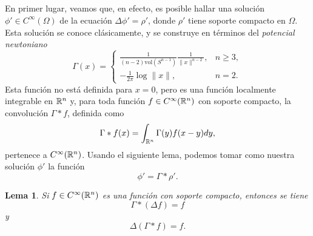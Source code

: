 \documentclass[11pt,a4paper]{amsbook}
\newtheorem{lemma}[subsection]{Lema}
\theoremstyle{remark} \newtheorem{rmk}[subsection]{Observación}
\theoremstyle{definition} \newtheorem{defn}[subsection]{Definición}
\theoremstyle{definition} \newtheorem{ex}[subsection]{Ejemplo}
\theoremstyle{definition} \newtheorem{ej}[subsection]{Ejercicio}
\begin{document}
\subsection{} En primer lugar, veamos que, en efecto, es posible hallar una solución $\phi'\in C^\infty(\Omega)$ de la ecuación $\Delta \phi' = \rho'$, donde $\rho'$ tiene soporte compacto en $\Omega$. Esta solución se conoce clásicamente, y se construye en términos del \emph{potencial newtoniano}
\begin{equation*}
  \Gamma(x) =
  \begin{cases}
\frac{1}{(n-2) \mathrm{vol}(S^{n-1})} \frac{1}{\lVert x \rVert^{n-2}},& n\geq 3, \\
- \frac{1}{2\pi} \log \lVert x \rVert,& n=2.
\end{cases}
\end{equation*}
Esta función no está definida para $x=0$, pero es una función localmente integrable en $\mathbb R^n$ y, para toda función $f\in C^\infty(\mathbb R^n)$ con soporte compacto, la convolución $\Gamma * f$, definida como
\begin{equation*}
\Gamma * f (x) = \int_{\mathbb R^n} \Gamma(y) f(x-y) dy,
\end{equation*}
pertenece a $C^\infty(\mathbb R^n)$. Usando el siguiente lema, podemos tomar como nuestra solución $\phi'$ la función
\begin{equation*}
\phi' = \Gamma * \rho'.
\end{equation*}


\begin{lemma}
  Si $f\in C^\infty(\mathbb R^n)$ es una función con soporte compacto, entonces se tiene
  \begin{equation*}
\Gamma*(\Delta f) = f
  \end{equation*}
  y
  \begin{equation*}
\Delta(\Gamma * f) = f.
  \end{equation*}
\end{lemma}
\end{document}
